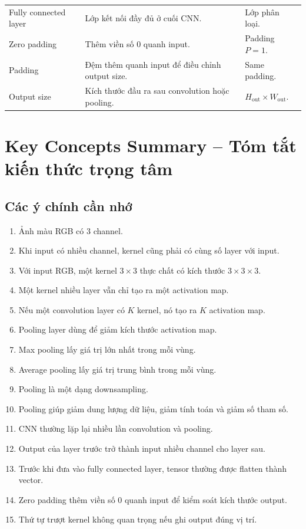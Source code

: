 \begin{longtable}{p{}p{}p{}}
Fully connected layer & Lớp kết nối đầy đủ ở cuối CNN. & Lớp phân loại. \\

Zero padding & Thêm viền số 0 quanh input. & Padding $P=1$. \\

Padding & Đệm thêm quanh input để điều chỉnh output size. & Same padding. \\

Output size & Kích thước đầu ra sau convolution hoặc pooling. & $H_{\text{out}}\times W_{\text{out}}$. \\

\bottomrule
\end{longtable}
\normalsize

\section{Key Concepts Summary -- Tóm tắt kiến thức trọng tâm}

\subsection{Các ý chính cần nhớ}

\begin{enumerate}
    \item Ảnh màu RGB có 3 channel.
    \item Khi input có nhiều channel, kernel cũng phải có cùng số layer với input.
    \item Với input RGB, một kernel $3\times3$ thực chất có kích thước $3\times3\times3$.
    \item Một kernel nhiều layer vẫn chỉ tạo ra một activation map.
    \item Nếu một convolution layer có $K$ kernel, nó tạo ra $K$ activation map.
    \item Pooling layer dùng để giảm kích thước activation map.
    \item Max pooling lấy giá trị lớn nhất trong mỗi vùng.
    \item Average pooling lấy giá trị trung bình trong mỗi vùng.
    \item Pooling là một dạng downsampling.
    \item Pooling giúp giảm dung lượng dữ liệu, giảm tính toán và giảm số tham số.
    \item CNN thường lặp lại nhiều lần convolution và pooling.
    \item Output của layer trước trở thành input nhiều channel cho layer sau.
    \item Trước khi đưa vào fully connected layer, tensor thường được flatten thành vector.
    \item Zero padding thêm viền số 0 quanh input để kiểm soát kích thước output.
    \item Thứ tự trượt kernel không quan trọng nếu ghi output đúng vị trí.
\end{enumerate}

